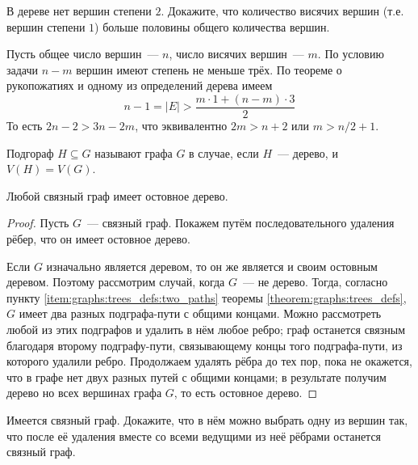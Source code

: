 \begin{Exercise}[counter=SecExercise, label={exercise:graphs:more_then_half_leaves}]
    \noindent
    В дереве нет вершин степени $ 2 $.
    Докажите, что количество висячих вершин (т.е. вершин степени $ 1 $) больше половины общего количества вершин.
\end{Exercise}

\begin{Answer}
    \noindent
    Пусть общее число вершин~--- $ n $, число висячих вершин~--- $ m $.
    По условию задачи $ n - m $ вершин имеют степень не меньше трёх.
    По теореме о рукопожатиях и одному из определений дерева имеем
    \[
        n - 1 = |E| > \frac{m \cdot 1 + (n - m) \cdot 3}{2}
    \]
    То есть $ 2 n - 2 > 3 n - 2 m $,
    что эквивалентно $ 2 m > n + 2 $ или $ m > n/2 + 1 $.
\end{Answer}

\begin{definition}
    \label{definition:graphs:spanning_tree}
    Подгораф $ H \subseteq G $ называют  графа $ G $ в случае,
    если $ H $~--- дерево, и $ V(H) = V(G) $.
\end{definition}

\begin{statement}
    \label{statement:graphs:connected_has_spanning_tree}
    Любой связный граф имеет остовное дерево.
\end{statement}

\begin{proof}
    Пусть $ G $~--- связный граф.
    Покажем путём последовательного удаления рёбер, что он имеет остовное дерево.

    Если $ G $ изначально является деревом,
    то он же является и своим остовным деревом.
    Поэтому рассмотрим случай, когда $ G $~--- не дерево.
    Тогда, согласно пункту \ref{item:graphs:trees_defs:two_paths} теоремы \ref{theorem:graphs:trees_defs},
    $ G $ имеет два разных подграфа-пути с общими концами.
    Можно рассмотреть любой из этих подграфов и удалить в нём любое ребро;
    граф останется связным благодаря второму подграфу-пути,
    связывающему концы того подграфа-пути, из которого удалили ребро.
    Продолжаем удалять рёбра до тех пор, пока не окажется, что в графе нет двух разных путей с общими концами;
    в результате получим дерево но всех вершинах графа $ G $, то есть остовное дерево.
\end{proof}

\begin{Exercise}[counter=SecExercise, label={exercise:graphs:can_delete_one_vertex}]
    \noindent
    Имеется связный граф.
    Докажите, что в нём можно выбрать одну из вершин так,
    что после её удаления вместе со всеми ведущими из неё рёбрами останется связный граф.
\end{Exercise}

